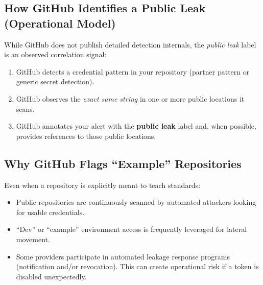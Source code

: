 \documentclass[11pt]{article}
\newcommand{\term}[1]{\textbf{#1}}
\begin{document}
\subsection{How GitHub Identifies a Public Leak (Operational Model)}
While GitHub does not publish detailed detection internals, the \emph{public leak} label is an observed correlation signal:
\begin{enumerate}
  \item GitHub detects a credential pattern in your repository (partner pattern or generic secret detection).
  \item GitHub observes the \emph{exact same string} in one or more public locations it scans.
  \item GitHub annotates your alert with the \term{public leak} label and, when possible, provides references to those public locations.
\end{enumerate}

\subsection{Why GitHub Flags ``Example'' Repositories}
Even when a repository is explicitly meant to teach standards:
\begin{itemize}
  \item Public repositories are continuously scanned by automated attackers looking for usable credentials.
  \item ``Dev'' or ``example'' environment access is frequently leveraged for lateral movement.
  \item Some providers participate in automated leakage response programs (notification and/or revocation). This can create operational risk if a token is disabled unexpectedly.
\end{itemize}
\end{document}
